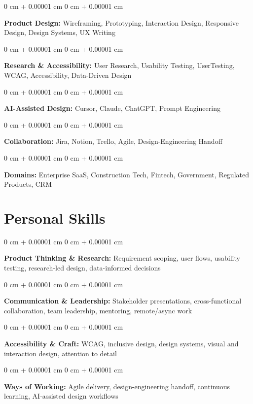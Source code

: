 \documentclass[10pt, letterpaper]{article}
\newenvironment{onecolentry}{
    \begin{adjustwidth}{
        0 cm + 0.00001 cm
    }{
        0 cm + 0.00001 cm
    }
}{
    \end{adjustwidth}
} %
\begin{document}
\begin{onecolentry}
    \textbf{Product Design:} Wireframing, Prototyping, Interaction Design, Responsive Design, Design Systems, UX Writing
\end{onecolentry}

\begin{onecolentry}
    \textbf{Research \& Accessibility:} User Research, Usability Testing, UserTesting, WCAG, Accessibility, Data-Driven Design
\end{onecolentry}

\begin{onecolentry}
    \textbf{AI-Assisted Design:} Cursor, Claude, ChatGPT, Prompt Engineering
\end{onecolentry}

\begin{onecolentry}
    \textbf{Collaboration:} Jira, Notion, Trello, Agile, Design-Engineering Handoff
\end{onecolentry}

\begin{onecolentry}
    \textbf{Domains:} Enterprise SaaS, Construction Tech, Fintech, Government, Regulated Products, CRM
\end{onecolentry}


\section{Personal Skills}
\begin{onecolentry}
    \textbf{Product Thinking \& Research:} Requirement scoping, user flows, usability testing, research-led design, data-informed decisions
\end{onecolentry}

\begin{onecolentry}
    \textbf{Communication \& Leadership:} Stakeholder presentations, cross-functional collaboration, team leadership, mentoring, remote/async work
\end{onecolentry}

\begin{onecolentry}
    \textbf{Accessibility \& Craft:} WCAG, inclusive design, design systems, visual and interaction design, attention to detail
\end{onecolentry}

\begin{onecolentry}
    \textbf{Ways of Working:} Agile delivery, design-engineering handoff, continuous learning, AI-assisted design workflows
\end{onecolentry}
\end{document}
